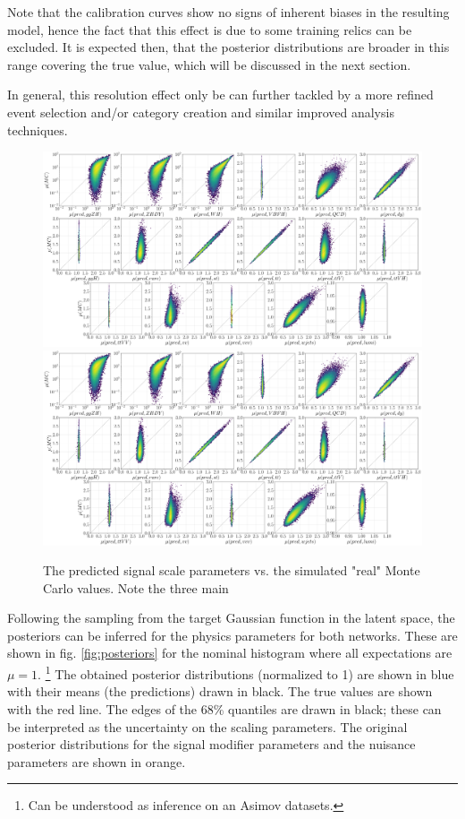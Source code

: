 Note that the calibration curves show no signs of inherent biases in the resulting model, hence the fact that this effect is due to some training relics can be excluded. It is expected then, that the posterior distributions are broader in this range covering the true value, which will be discussed in the next section.

In general, this resolution effect only be can further tackled by a more refined event selection and/or category creation and similar improved analysis techniques.

\begin{figure}[h!]
	\centering
	\includegraphics[width=\linewidth]{figures/inference/p}
	\includegraphics[width=\linewidth]{figures/inference/p_SN}
	\caption{The predicted signal scale parameters vs. the simulated "real" Monte Carlo values. Note the three main }
	\label{fig:predictions}
\end{figure}


Following the sampling from the target Gaussian function in the latent space, the posteriors can be inferred for the physics parameters for both networks. These are shown in fig. \ref{fig:posteriors} for the nominal histogram where all expectations are $\mu=1$. \footnote{Can be understood as inference on an Asimov datasets.} The obtained posterior distributions (normalized to 1) are shown in blue with their means (the predictions) drawn in black. The true values are shown with the red line. The edges of the 68\% quantiles are drawn in black; these can be interpreted as the uncertainty on the scaling parameters. The original posterior distributions for the signal modifier parameters and the nuisance parameters are shown in orange.

